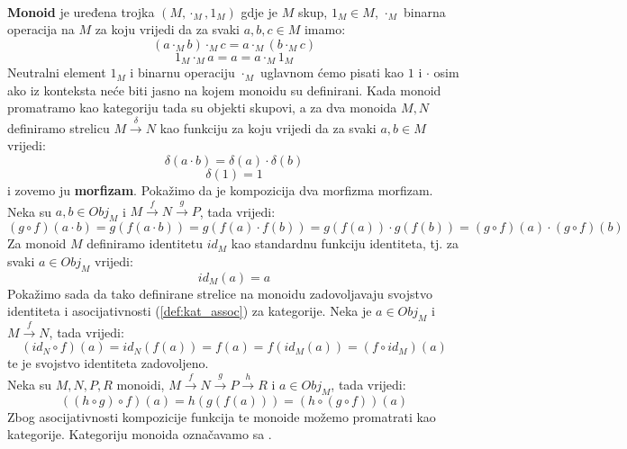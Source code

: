   \begin{example}\ \\
   
    \noindent \textbf{Monoid} je uređena trojka $(M, \cdot_M, 1_M)$ gdje je $M$ skup, $1_M
    \in M$, $\cdot_M$ binarna operacija na $M$ za koju vrijedi da za svaki $a, b, c \in M$ imamo:
    \begin{equation*}
      (a \cdot_M b) \cdot_M c = a \cdot_M (b \cdot_M c)
    \end{equation*}
    \begin{equation*}
      1_M \cdot_M a = a = a \cdot_M 1_M
    \end{equation*}
    Neutralni element $1_M$ i binarnu operaciju $\cdot_M$ uglavnom ćemo pisati
    kao $1$ i $\cdot$ osim ako iz konteksta neće biti jasno na kojem monoidu
    su definirani.
    Kada monoid promatramo kao kategoriju tada su objekti skupovi, a
    za dva monoida $M, N$ definiramo strelicu $M \xrightarrow{\delta} N$ kao
    funkciju za koju vrijedi da za svaki $a, b \in M$ vrijedi:
    \begin{equation*}
      \delta(a \cdot b) = \delta(a) \cdot \delta(b)
    \end{equation*}
    \begin{equation*}
      \delta(1) = 1
    \end{equation*}
    i zovemo ju \textbf{morfizam}.
    Pokažimo da je kompozicija dva morfizma morfizam.
    Neka su $a, b \in Obj_M$ i $M \xrightarrow{f} N \xrightarrow{g} P$, tada vrijedi:
    \begin{equation*}
      (g \circ f)(a \cdot b) = g(f(a \cdot b)) = g(f(a) \cdot f(b)) = g(f(a))
      \cdot g(f(b)) = (g \circ f)(a) \cdot (g \circ f)(b)
    \end{equation*}
    Za monoid $M$ definiramo identitetu $id_M$ kao standardnu funkciju
    identiteta, tj. za svaki $a \in Obj_M$ vrijedi:
    \begin{equation*}
      id_M(a) = a
    \end{equation*}
    Pokažimo sada da tako definirane strelice na monoidu zadovoljavaju
    svojstvo identiteta i asocijativnosti (\ref{def:kat_assoc}) za kategorije.
    Neka je $a \in Obj_M$ i $M \xrightarrow{f} N$, tada vrijedi:
    \begin{equation*}
      (id_N \circ f)(a) = id_N(f(a)) = f(a) = f(id_M(a)) = (f \circ id_M)(a)
    \end{equation*}
    te je svojstvo identiteta zadovoljeno.\\
    Neka su $M, N, P, R$ monoidi, $M \xrightarrow{f} N \xrightarrow{g} P \xrightarrow{h} R$
    i $a \in Obj_M$, tada vrijedi:
    \begin{equation*}
      ((h \circ g) \circ f)(a) = h(g(f(a))) = (h \circ (g \circ f))(a)
    \end{equation*}
    Zbog asocijativnosti kompozicije funkcija te monoide možemo promatrati kao
    kategorije. Kategoriju monoida označavamo sa .
  
  \end{example}

